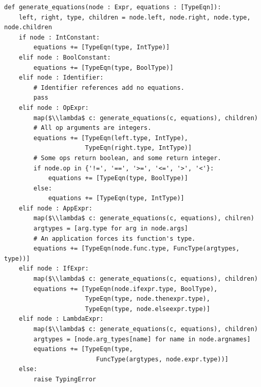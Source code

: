 \documentclass[border=10pt]{standalone}
\begin{document}
\begin{lstlisting}
def generate_equations(node : Expr, equations : [TypeEqn]): 
    left, right, type, children = node.left, node.right, node.type, node.children
    if node : IntConstant:
        equations += [TypeEqn(type, IntType)]
    elif node : BoolConstant:
        equations += [TypeEqn(type, BoolType)]
    elif node : Identifier:
        # Identifier references add no equations.
        pass
    elif node : OpExpr:
        map($\\lambda$ c: generate_equations(c, equations), children)
        # All op arguments are integers.
        equations += [TypeEqn(left.type, IntType), 
                      TypeEqn(right.type, IntType)]
        # Some ops return boolean, and some return integer.
        if node.op in {'!=', '==', '>=', '<=', '>', '<'}:
            equations += [TypeEqn(type, BoolType)]
        else:
            equations += [TypeEqn(type, IntType)]
    elif node : AppExpr:
        map($\\lambda$ c: generate_equations(c, equations), chilren)
        argtypes = [arg.type for arg in node.args]
        # An application forces its function's type.
        equations += [TypeEqn(node.func.type, FuncType(argtypes, type))]
    elif node : IfExpr:
        map($\\lambda$ c: generate_equations(c, equations), children)
        equations += [TypeEqn(node.ifexpr.type, BoolType),
                      TypeEqn(type, node.thenexpr.type),
                      TypeEqn(type, node.elseexpr.type)]
    elif node : LambdaExpr:
        map($\\lambda$ c: generate_equations(c, equations), children)
        argtypes = [node.arg_types[name] for name in node.argnames]
        equations += [TypeEqn(type,
                         FuncType(argtypes, node.expr.type))]
    else:
        raise TypingError
\end{lstlisting}
\end{document}
